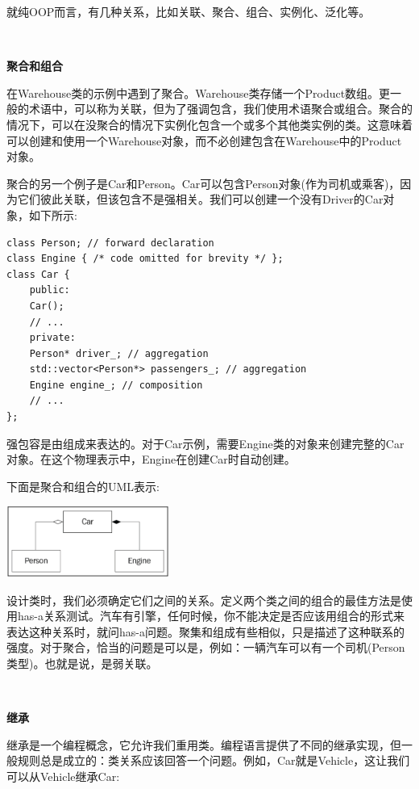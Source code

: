 就纯OOP而言，有几种关系，比如关联、聚合、组合、实例化、泛化等。 \par

\noindent\textbf{}\ \par
\textbf{聚合和组合} \ \par
在Warehouse类的示例中遇到了聚合。Warehouse类存储一个Product数组。更一般的术语中，可以称为关联，但为了强调包含，我们使用术语聚合或组合。聚合的情况下，可以在没聚合的情况下实例化包含一个或多个其他类实例的类。这意味着可以创建和使用一个Warehouse对象，而不必创建包含在Warehouse中的Product对象。 \par
聚合的另一个例子是Car和Person。Car可以包含Person对象(作为司机或乘客)，因为它们彼此关联，但该包含不是强相关。我们可以创建一个没有Driver的Car对象，如下所示:\par

\begin{lstlisting}[caption={}]
class Person; // forward declaration
class Engine { /* code omitted for brevity */ };
class Car {
	public:
	Car();
	// ...
	private:
	Person* driver_; // aggregation
	std::vector<Person*> passengers_; // aggregation
	Engine engine_; // composition
	// ...
};
\end{lstlisting}

强包容是由组成来表达的。对于Car示例，需要Engine类的对象来创建完整的Car对象。在这个物理表示中，Engine在创建Car时自动创建。 \par
下面是聚合和组合的UML表示: \par

\begin{center}
	\includegraphics[width=0.4\textwidth]{content/Section-1/Chapter-3/12}
\end{center}

设计类时，我们必须确定它们之间的关系。定义两个类之间的组合的最佳方法是使用has-a关系测试。汽车有引擎，任何时候，你不能决定是否应该用组合的形式来表达这种关系时，就问has-a问题。聚集和组成有些相似，只是描述了这种联系的强度。对于聚合，恰当的问题是可以是，例如：一辆汽车可以有一个司机(Person类型)。也就是说，是弱关联。 \par

\noindent\textbf{}\ \par
\textbf{继承} \ \par
继承是一个编程概念，它允许我们重用类。编程语言提供了不同的继承实现，但一般规则总是成立的：类关系应该回答一个问题。例如，Car就是Vehicle，这让我们可以从Vehicle继承Car: \par

